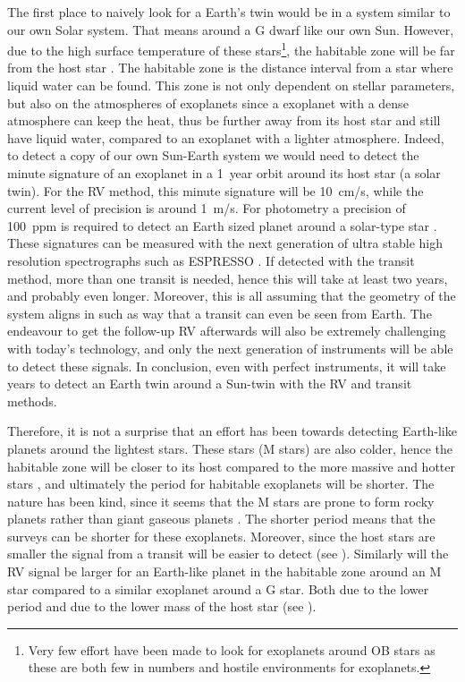 The first place to naively look for a Earth's twin would be in a system similar to our own Solar
system. That means around a G dwarf like our own Sun. However, due to the high surface temperature
of these stars\footnote{Very few effort have been made to look for exoplanets around OB stars as
these are both few in numbers and hostile environments for exoplanets.}, the habitable zone will be
far from the host star \citep[see e.g.][]{Kasting1993}. The habitable zone is the distance interval
from a star where liquid water can be found. This zone is not only dependent on stellar parameters,
but also on the atmospheres of exoplanets since a exoplanet with a dense atmosphere can keep the
heat, thus be further away from its host star and still have liquid water, compared to an exoplanet
with a lighter atmosphere. Indeed, to detect a copy of our own Sun-Earth system we would need to
detect the minute signature of an exoplanet in a \SI{1}{year} orbit around its host star (a solar
twin). For the RV method, this minute signature will be \SI{10}{cm/s}, while the current level of
precision is around \SI{1}{m/s}. For photometry a precision of \SI{100}{ppm} is required to detect
an Earth sized planet around a solar-type star \citep{Borucki2017}. These signatures can be measured
with the next generation of ultra stable high resolution spectrographs such as ESPRESSO
\citep{ESPRESSO}. If detected with the transit method, more than one transit is needed, hence this
will take at least two years, and probably even longer. Moreover, this is all assuming that the
geometry of the system aligns in such as way that a transit can even be seen from Earth. The
endeavour to get the follow-up RV afterwards will also be extremely challenging with today's
technology, and only the next generation of instruments will be able to detect these signals. In
conclusion, even with perfect instruments, it will take years to detect an Earth twin around a
Sun-twin with the RV and transit methods.

Therefore, it is not a surprise that an effort has been towards detecting Earth-like planets around
the lightest stars. These stars (M stars) are also colder, hence the habitable zone will be closer
to its host compared to the more massive and hotter stars \citep{Kasting1997}, and ultimately the
period for habitable exoplanets will be shorter. The nature has been kind, since it seems that the M
stars are prone to form rocky planets rather than giant gaseous planets
\citep{Bonfils2013,Delfosse2013}. The shorter period means that the surveys can be shorter for these
exoplanets. Moreover, since the host stars are smaller the signal from a transit will be easier to
detect (see ). Similarly will the RV signal be larger for an Earth-like planet in
the habitable zone around an M star compared to a similar exoplanet around a G star. Both due to the
lower period and due to the lower mass of the host star (see ).


